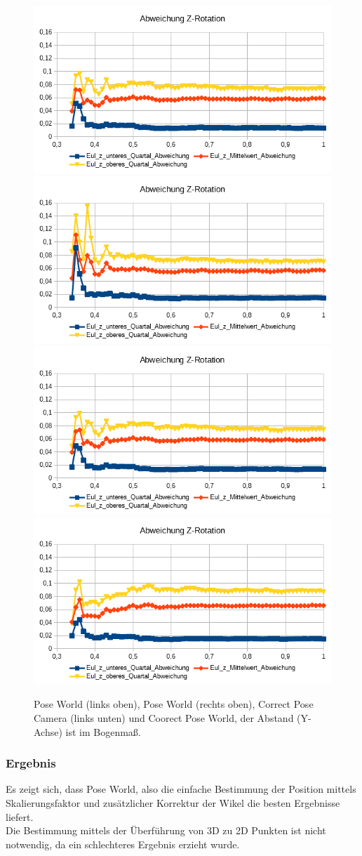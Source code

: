\begin{figure}
	\centering
	\includegraphics[width=0.45\linewidth]{tabelle/Z_Rot_PC}
	\includegraphics[width=0.45\linewidth]{tabelle/Z_Rot_PW}
	\includegraphics[width=0.45\linewidth]{tabelle/Z_Rot_CPC}
	\includegraphics[width=0.45\linewidth]{tabelle/Z_Rot_CPW}
	\caption{Pose World (links oben), Pose World (rechts oben), Correct Pose Camera (links unten) und Coorect Pose World, der Abstand (Y-Achse) ist im Bogenmaß.}
	\label{img_Z_Pot}
\end{figure}
\subsubsection{Ergebnis}
Es zeigt sich, dass Pose World, also die einfache Bestimmung der Position mittels Skalierungsfaktor und zusätzlicher Korrektur der Wikel die besten Ergebnisse liefert.\\
Die Bestimmung mittels der Überführung von 3D zu 2D Punkten ist nicht notwendig, da ein schlechteres Ergebnis erzieht wurde.
